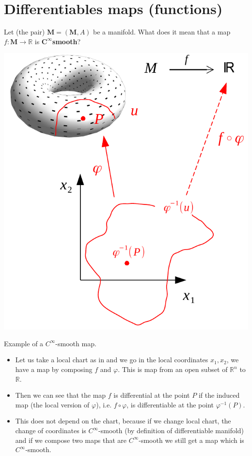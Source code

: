 \documentclass[../main.tex]{subfiles}
\begin{document}
\section[Differentiables maps]{Differentiables maps (functions)}
Let (the pair) $\mathbf{M}=\left(\mathbf{M}, A\right)$ be a manifold. What does it mean that a map $f:\mathbf{M}\to\mathbb{R}$ is $\mathbf{C^\infty}$\textbf{smooth}?
\begin{marginfigure}
	\includegraphics{images/c_smooth.pdf}
	\caption[$C^\infty$-smooth map]{Example of a $C^\infty$-smooth map.}
\end{marginfigure}
\begin{itemize}
    \item Let us take a local chart as in  and we go in the local coordinates $x_1,x_2$, we have a map by composing $f$ and $\varphi$. This is map from an open subset of $\mathbb{R}^n$ to $\mathbb{R}$.
    \item Then we can see that the map $f$ is differential at the point $P$ if the induced map (the local version of  $\varphi$), i.e. $f\circ\varphi$, is differentiable  at the point $\varphi^{-1}(P)$.
    \item This does not depend on the chart, because if we change local chart, the change of coordinates is $C^\infty$-smooth (by definition of differentiable manifold) and if we compose two maps that are $C^\infty$-smooth we still get a map which is $C^\infty$-smooth.
\end{itemize}
\end{document}
